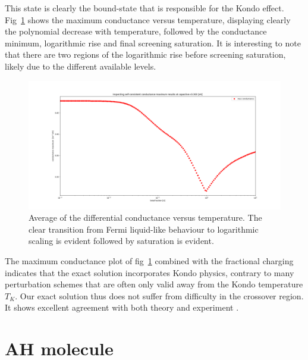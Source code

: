 \documentclass{article}
\begin{document}
\begin{multicols}{2}
        This state is clearly the bound-state that is responsible for the Kondo effect. Fig~\ref{fig:conductance} shows the maximum conductance versus temperature, displaying clearly the polynomial decrease with temperature, followed by the conductance minimum, logarithmic rise and final screening saturation. It is interesting to note that there are two regions of the logarithmic rise before screening saturation, likely due to the different available levels.
        
        \begin{figure}[b]
            \centering
            \includegraphics[width=\textwidth]{fig/figure_5.png}
            \caption{\label{fig:conductance} Average of the differential conductance versus temperature. The clear transition from Fermi liquid-like behaviour to logarithmic scaling is evident followed by saturation is evident.}
        \end{figure}
        
        The maximum conductance plot of fig~\ref{fig:conductance} combined with the fractional charging indicates that the exact solution incorporates Kondo physics, contrary to many perturbation schemes that are often only valid away from the Kondo temperature $T_K$. Our exact solution thus does not suffer from difficulty in the crossover region. It shows excellent agreement with both theory and experiment \cite{Sasaki2000}. 
         
    \section{AH molecule}\label{sec:ahmolecule}
        

\end{multicols}
\end{document}
